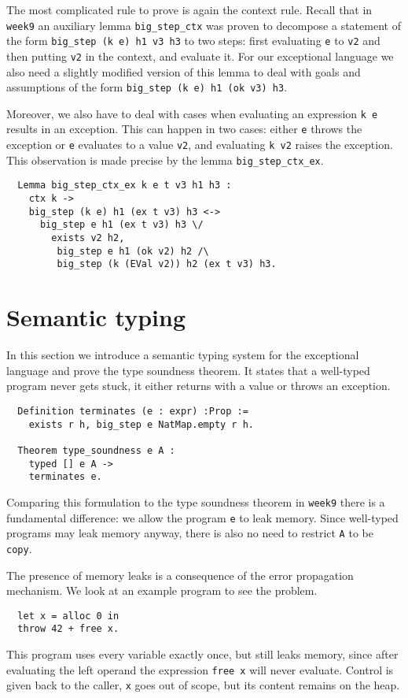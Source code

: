 \documentclass{article}
\begin{document}
The most complicated rule to prove is again the context rule. Recall that in \texttt{week9} an auxiliary lemma \texttt{big\_step\_ctx} was proven to decompose a statement of the form \texttt{big\_step (k e) h1 v3 h3} to two steps: first evaluating \texttt{e} to \texttt{v2} and then putting \texttt{v2} in the context, and evaluate it. For our exceptional language we also need a slightly modified version of this lemma to deal with goals and assumptions of the form \texttt{big\_step (k e) h1 (ok v3) h3}. 

Moreover, we also have to deal with cases when evaluating an expression \texttt{k e} results in an exception. This can happen in two cases: either \texttt{e} throws the exception or \texttt{e} evaluates to a value \texttt{v2}, and evaluating \texttt{k v2} raises the exception. This observation is made precise by the lemma \texttt{big\_step\_ctx\_ex}.
\begin{lstlisting}
  Lemma big_step_ctx_ex k e t v3 h1 h3 :
    ctx k ->
    big_step (k e) h1 (ex t v3) h3 <->
      big_step e h1 (ex t v3) h3 \/
        exists v2 h2,
         big_step e h1 (ok v2) h2 /\
         big_step (k (EVal v2)) h2 (ex t v3) h3.
\end{lstlisting}

\section{Semantic typing}

In this section we introduce a semantic typing system for the exceptional language and prove the type soundness theorem. It states that a well-typed program never gets stuck, it either returns with a value or throws an exception.
\begin{lstlisting}
  Definition terminates (e : expr) :Prop :=
    exists r h, big_step e NatMap.empty r h.
  
  Theorem type_soundness e A :
    typed [] e A ->
    terminates e.
\end{lstlisting}
Comparing this formulation to the type soundness theorem in \texttt{week9} there is a fundamental difference: we allow the program \texttt{e} to leak memory. Since well-typed programs may leak memory anyway, there is also no need to restrict \texttt{A} to be \texttt{copy}.

The presence of memory leaks is a consequence of the error propagation mechanism. We look at an example program to see the problem.
\begin{lstlisting}
  let x = alloc 0 in
  throw 42 + free x.
\end{lstlisting}
This program uses every variable exactly once, but still leaks memory, since after evaluating the left operand the expression \texttt{free x} will never evaluate. Control is given back to the caller, \texttt{x} goes out of scope, but its content remains on the heap.
\end{document}
